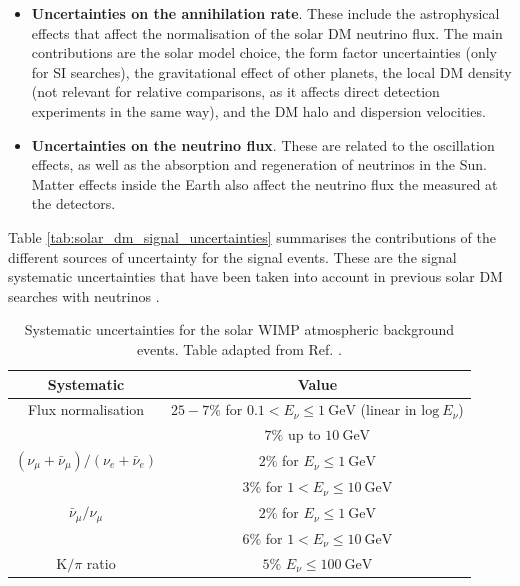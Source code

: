 \begin{itemize}
	\item \textbf{Uncertainties on the annihilation rate}. These include the astrophysical effects that affect the normalisation of the solar DM neutrino flux. The main contributions are the solar model choice, the form factor uncertainties (only for SI searches), the gravitational effect of other planets, the local DM density (not relevant for relative comparisons, as it affects direct detection experiments in the same way), and the DM halo and dispersion velocities.
	\item \textbf{Uncertainties on the neutrino flux}. These are related to the oscillation effects, as well as the absorption and regeneration of neutrinos in the Sun. Matter effects inside the Earth also affect the neutrino flux the measured at the detectors.
\end{itemize}

Table \ref{tab:solar_dm_signal_uncertainties} summarises the contributions of the different sources of uncertainty for the signal events. These are the signal systematic uncertainties that have been taken into account in previous solar DM searches with neutrinos \cite{Boliev2013,Super-Kamiokande2015,Principato2021}.

\begin{table}[t]
	\caption[Systematic uncertainties for the solar WIMP atmospheric background events.]{Systematic uncertainties for the solar WIMP atmospheric background events. Table adapted from Ref. \cite{Super-Kamiokande2017}.}
	\begin{center}
		\begin{small}
			\begin{tabular}{c|c}
				Systematic                                            & Value \\[2mm] \hline
				\rule{0pt}{1.1\normalbaselineskip}Flux normalisation                                    & $25-7\%$ for $0.1 < E_{\nu} \leq 1~\mathrm{GeV}$ (linear in $\mathrm{log} ~ E_{\nu}$)\\[1mm] & $7\%$ up to $10~\mathrm{GeV}$ \\[2mm]
				$(\nu_{\mu}+\bar{\nu}_{\mu})/(\nu_{e}+\bar{\nu}_{e})$ & $2\%$ for $E_{\nu} \leq 1~\mathrm{GeV}$ \\[1mm] & $3\%$ for $1 < E_{\nu} \leq 10~\mathrm{GeV}$ \\[2mm]
				$\bar{\nu}_{\mu}/\nu_{\mu}$                           & $2\%$ for $E_{\nu} \leq 1~\mathrm{GeV}$ \\[1mm] & $6\%$ for $1 < E_{\nu} \leq 10~\mathrm{GeV}$ \\[2mm]
				$\mathrm{K}/\pi$ ratio                                & $5\%$ $E_{\nu} \leq 100~\mathrm{GeV}$
			\end{tabular}
		\end{small}
	\end{center}
	\label{tab:solar_dm_background_uncertainties}
\end{table}

